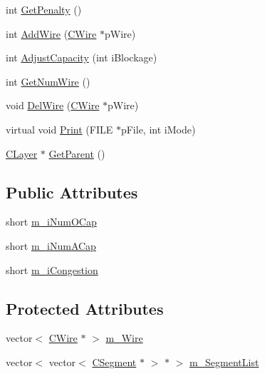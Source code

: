 \begin{DoxyCompactItemize}
int \mbox{\hyperlink{classCBoundary_ad21081690462e7f63ec76aa90db0936b}{Get\+Penalty}} ()
\item 
int \mbox{\hyperlink{classCBoundary_a8cd3af613c5651eb65fe697dafc36381}{Add\+Wire}} (\mbox{\hyperlink{classCWire}{C\+Wire}} $\ast$p\+Wire)
\item 
int \mbox{\hyperlink{classCBoundary_a81895020861c7628a3a3a684a558960a}{Adjust\+Capacity}} (int i\+Blockage)
\item 
int \mbox{\hyperlink{classCBoundary_afcecb6cf9aae108be1751b34e85e3679}{Get\+Num\+Wire}} ()
\item 
void \mbox{\hyperlink{classCBoundary_a44523ce5f37f606ec12459b0a2d6d92a}{Del\+Wire}} (\mbox{\hyperlink{classCWire}{C\+Wire}} $\ast$p\+Wire)
\item 
virtual void \mbox{\hyperlink{classCBoundary_a12a1e37297bd35f915544d02bd8c0cf1}{Print}} (F\+I\+LE $\ast$p\+File, int i\+Mode)
\item 
\mbox{\hyperlink{classCLayer}{C\+Layer}} $\ast$ \mbox{\hyperlink{classCBoundary_aaa09500786bfd880681cbd98700cd9f7}{Get\+Parent}} ()
\end{DoxyCompactItemize}
\subsection*{Public Attributes}
\begin{DoxyCompactItemize}
\item 
short \mbox{\hyperlink{classCBoundary_aab6fa7d9b76f68b8eb7c20a57469ce9e}{m\+\_\+i\+Num\+O\+Cap}}
\item 
short \mbox{\hyperlink{classCBoundary_afded4529a5b69a422d6e15405f024987}{m\+\_\+i\+Num\+A\+Cap}}
\item 
short \mbox{\hyperlink{classCBoundary_aba753e35280470559958c2c2d607f6a9}{m\+\_\+i\+Congestion}}
\end{DoxyCompactItemize}
\subsection*{Protected Attributes}
\begin{DoxyCompactItemize}
\item 
vector$<$ \mbox{\hyperlink{classCWire}{C\+Wire}} $\ast$ $>$ \mbox{\hyperlink{classCBoundary_a2912241d7c318a7733b1efcc82c7cb3a}{m\+\_\+\+Wire}}
\item 
vector$<$ vector$<$ \mbox{\hyperlink{classCSegment}{C\+Segment}} $\ast$ $>$ $\ast$ $>$ \mbox{\hyperlink{classCBoundary_af055739711c239aa34367a294ba6dab3}{m\+\_\+\+Segment\+List}}
\end{DoxyCompactItemize}
